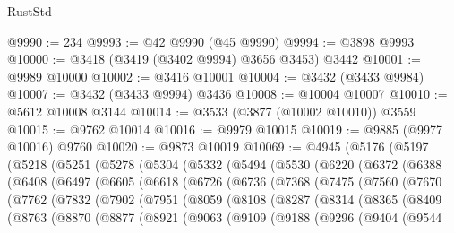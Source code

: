 \begin{lexlean}{RustStd}
\begin{coremodule}
@9990 := 234
@9993 := @42 @9990 (@45 @9990)
@9994 := @3898 @9993
@10000 := @3418 (@3419 (@3402 @9994) @3656 @3453) @3442
@10001 := @9989 @10000
@10002 := @3416 @10001
@10004 := @3432 (@3433 @9984)
@10007 := @3432 (@3433 @9994) @3436
@10008 := @10004 @10007
@10010 := @5612 @10008 @3144
@10014 := @3533 (@3877 (@10002 @10010)) @3559
@10015 := @9762 @10014
@10016 := @9979 @10015
@10019 := @9885 (@9977 @10016) @9760
@10020 := @9873 @10019
@10069 := @4945
    (@5176
      (@5197
        (@5218
          (@5251
            (@5278
              (@5304
                (@5332
                  (@5494
                    (@5530
                      (@6220
                        (@6372
                          (@6388
                            (@6408
                              (@6497
                                (@6605
                                  (@6618
                                    (@6726
                                      (@6736
                                        (@7368
                                          (@7475
                                            (@7560
                                              (@7670
                                                (@7762
                                                  (@7832
                                                    (@7902
                                                      (@7951
                                                        (@8059
                                                          (@8108
                                                            (@8287
                                                              (@8314
                                                                (@8365
                                                                  (@8409
                                                                    (@8763
                                                                      (@8870
                                                                        (@8877
                                                                          (@8921
                                                                            (@9063
                                                                              (@9109
                                                                                (@9188
                                                                                  (@9296
                                                                                    (@9404
                                                                                      (@9544

\end{coremodule}
\end{lexlean}
